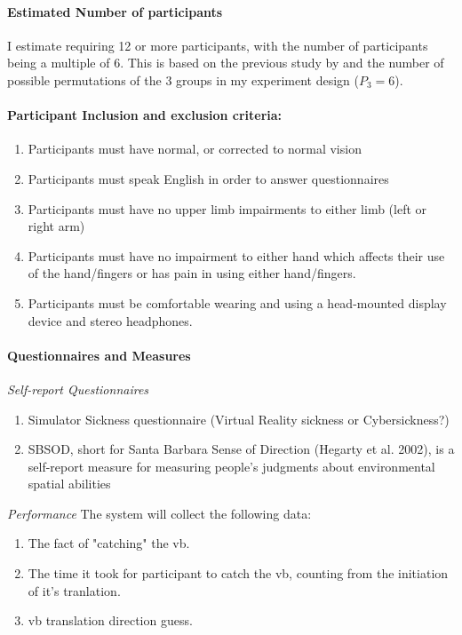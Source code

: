 \paragraph{Estimated Number of participants}
I estimate requiring 12 or more participants, with the number of participants being a multiple of 6. This is based on the previous study by \cite{gutwin_chalk_2011} and the number of possible permutations of the 3 groups in my experiment design ($P_{3}=6$).


\paragraph{Participant Inclusion and exclusion criteria:}
\begin{enumerate}
	\item Participants must have normal, or corrected to normal vision
	\item Participants must speak English in order to answer questionnaires 
	\item Participants must have no upper limb impairments to either limb (left or right arm)
	\item Participants must have no impairment to either hand which affects their use of the hand/fingers or has pain in using either hand/fingers.
	\item Participants must be comfortable wearing and using a head-mounted display device and stereo headphones. 
\end{enumerate}

\paragraph{Questionnaires and Measures} \mbox{} \newline \newline
\textit{Self-report Questionnaires} \newline
\begin{enumerate}
	\item Simulator Sickness questionnaire (Virtual Reality sickness or Cybersickness?)
	\item SBSOD, short for Santa Barbara Sense of Direction (Hegarty et al. 2002), is a self-report measure for measuring people’s judgments about environmental spatial abilities \cite{jr_3d_2017}  \newline
\end{enumerate}

\textit{Performance} \newline
The system will collect the following data:
\begin{enumerate}
	\item The fact of "catching" the \gls{vb}.
	\item The time it took for participant to catch the \gls{vb}, counting from the initiation of it's tranlation.
	\item \gls{vb} translation direction guess.
\end{enumerate}


